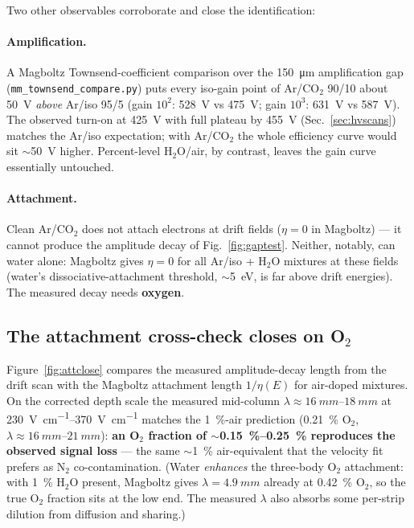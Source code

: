 \documentclass[11pt,a4paper]{article}
\begin{document}
Two other observables corroborate and close the identification:

\paragraph{Amplification.}  A Magboltz Townsend-coefficient comparison over
the \SI{150}{\micro\meter} amplification gap
(\texttt{mm\_townsend\_compare.py}) puts every iso-gain point of
Ar/CO$_2$ 90/10 about \SI{50}{V} \emph{above} Ar/iso 95/5 (gain $10^2$:
\SI{528}{V} vs \SI{475}{V}; gain $10^3$: \SI{631}{V} vs \SI{587}{V}).  The
observed turn-on at \SI{425}{V} with full plateau by \SI{455}{V}
(Sec.~\ref{sec:hvscans}) matches the Ar/iso expectation; with Ar/CO$_2$ the
whole efficiency curve would sit $\sim$\SI{50}{V} higher.  Percent-level
H$_2$O/air, by contrast, leaves the gain curve essentially untouched.

\paragraph{Attachment.}  Clean Ar/CO$_2$ does not attach electrons at drift
fields ($\eta = 0$ in Magboltz) --- it cannot produce the amplitude decay of
Fig.~\ref{fig:gaptest}.  Neither, notably, can water alone: Magboltz gives
$\eta = 0$ for all Ar/iso + H$_2$O mixtures at these fields (water's
dissociative-attachment threshold, $\sim$\SI{5}{eV}, is far above drift
energies).  The measured decay needs \textbf{oxygen}.

\subsection{The attachment cross-check closes on O$_2$}

Figure~\ref{fig:attclose} compares the measured amplitude-decay length from
the drift scan with the Magboltz attachment length $1/\eta(E)$ for
air-doped mixtures.  On the corrected depth scale the measured mid-column
$\lambda \approx \SIrange{16}{18}{mm}$ at
\SIrange{230}{370}{\volt\per\centi\meter} matches the \SI{1}{\percent}-air
prediction (\SI{0.21}{\percent} O$_2$,
$\lambda\approx\SIrange{16}{21}{mm}$):
\textbf{an O$_2$ fraction of $\sim$\SIrange{0.15}{0.25}{\percent}
reproduces the observed signal loss} --- the same $\sim$\SI{1}{\percent}
air-equivalent that the velocity fit prefers as N$_2$ co-contamination.
(Water \emph{enhances} the three-body O$_2$ attachment: with
\SI{1}{\percent} H$_2$O present, Magboltz gives $\lambda=\SI{4.9}{mm}$
already at \SI{0.42}{\percent} O$_2$, so the true O$_2$ fraction sits at
the low end.  The measured $\lambda$ also absorbs some per-strip dilution
from diffusion and sharing.)
\end{document}
